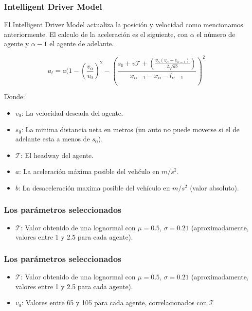 \documentclass[10pt, compress]{beamer}
\begin{document}
\begin{frame}[fragile]

\frametitle{Intelligent Driver Model}
El Intelligent Driver Model actualiza la posici\'on y velocidad como mencionamos anteriormente. El calculo de la aceleraci\'on es el siguiente, con $\alpha$ el n\'umero de agente y $\alpha - 1$ el agente de adelante.

  \begin{equation*}
    a_t = a (1 - (\frac{v_\alpha}{v_0})^2 - (\frac{s_0 + v\mathcal{T} + (\frac{v_\alpha (v_\alpha - v_{\alpha-1})}{2\sqrt{ab}})}{x_{\alpha-1} - x_\alpha - l_{\alpha-1}})^2
  \end{equation*}

Donde:
\begin{itemize}
\item $v_0$: La velocidad deseada del agente.
\item $s_0$: La minima distancia neta en metros (un auto no puede moverse si el de adelante esta a menos de $s_0$).
\item $\mathcal{T}$: El headway del agente.
\item $a$: La aceleraci\'on m\'axima posible del veh\'culo en $m/s^2$.
\item $b$: La desaceleraci\'on maxima posible del veh\'iculo en $m/s^2$ (valor absoluto).
\end{itemize}

\end{frame}

\begin{frame}[fragile]

\frametitle{Los par\'ametros seleccionados}

\begin{itemize}

\item $\mathcal{T}$: Valor obtenido de una lognormal con $\mu = 0.5$, $\sigma = 0.21$ (aproximadamente, valores entre 1 y 2.5 para cada agente).

\end{itemize}

\end{frame}

\begin{frame}[fragile]

\frametitle{Los par\'ametros seleccionados}

\begin{itemize}

\item $\mathcal{T}$: Valor obtenido de una lognormal con $\mu = 0.5$, $\sigma = 0.21$ (aproximadamente, valores entre 1 y 2.5 para cada agente).
\item $v_0$: Valores entre 65 y 105 para cada agente, correlacionados con $\mathcal{T}$

\end{itemize}

\end{frame}
\end{document}
